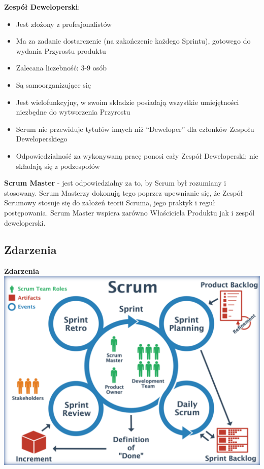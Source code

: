 \documentclass[12pt]{article}
\begin{document}
    \begin{definition}
        \textbf{Zespół Deweloperski}:
        \begin{itemize}
            \item Jest złożony z profesjonalistów
            \item Ma za zadanie dostarczenie (na zakończenie każdego Sprintu), gotowego do wydania Przyrostu produktu
            \item Zalecana liczebność: 3-9 osób
            \item Są samoorganizujące się
            \item Jest wielofunkcyjny, w swoim składzie posiadają wszystkie umiejętności niezbędne do wytworzenia Przyrostu
            \item Scrum nie przewiduje tytułów innych niż ``Deweloper'' dla członków Zespołu Deweloperskiego
            \item Odpowiedzialność za wykonywaną pracę ponosi cały Zespół Deweloperski; nie składają się z podzespołów
        \end{itemize}
    \end{definition}

    \begin{definition}
        \textbf{Scrum Master} - jest odpowiedzialny za to, by Scrum był rozumiany i stosowany. Scrum Masterzy dokonują tego poprzez upewnianie się,
        że Zespół Scrumowy stosuje się do założeń teorii Scruma, jego praktyk i reguł postępowania. Scrum Master wspiera zarówno Właściciela Produktu jak i zespól deweloperski.
    \end{definition}

    \subsection{Zdarzenia}

    \begin{definition}
        \textbf{Zdarzenia} \\
        \includegraphics[width=\linewidth]{scrum_events.png}
    \end{definition}
\end{document}
